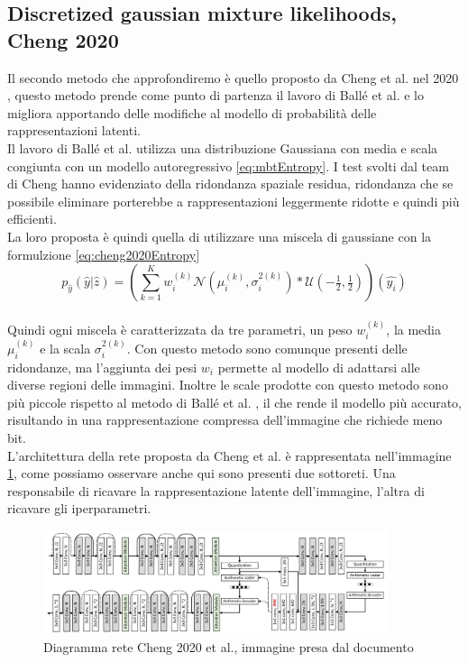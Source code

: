 \subsection{Discretized gaussian mixture likelihoods, Cheng 2020}
Il secondo metodo che approfondiremo è quello proposto da Cheng et al. nel 2020 \cite{cheng2020learned}, questo metodo prende come punto di partenza il lavoro di Ballé et al. \cite{minnen2018joint} e lo migliora apportando delle modifiche al modello di probabilità delle rappresentazioni latenti.\\
Il lavoro di Ballé et al. \cite{minnen2018joint} utilizza una distribuzione Gaussiana con media e scala congiunta con un modello autoregressivo \ref{eq:mbtEntropy}. I test svolti dal team di Cheng hanno evidenziato della ridondanza spaziale residua, ridondanza che se possibile eliminare porterebbe a rappresentazioni leggermente ridotte e quindi più efficienti.\\
La loro proposta è quindi quella di utilizzare una miscela di gaussiane con la formulzione \ref{eq:cheng2020Entropy}
\begin{equation}\label{eq:cheng2020Entropy}
    p_{\hat{y}}(\hat{y}|\hat{z}) = (\sum_{k=1}^{K} w_{i}^{(k)} \mathcal{N}(\mu_{i}^{(k)},\sigma_{i}^{2(k)})*\mathcal{U}(-\tfrac{1}{2},\tfrac{1}{2}))(\hat{y_{i}})
\end{equation}\\
Quindi ogni miscela è caratterizzata da tre parametri, un peso $w_{i}^{(k)}$, la media $\mu_{i}^{(k)}$ e la scala $\sigma_{i}^{2(k)}$.
Con questo metodo sono comunque presenti delle ridondanze, ma l’aggiunta dei pesi $w_{i}$ permette al modello di adattarsi alle diverse regioni delle immagini. Inoltre le scale prodotte con questo metodo sono più piccole rispetto al metodo di Ballé et al. \cite{minnen2018joint}, il che rende il modello più accurato, risultando in una rappresentazione compressa dell’immagine che richiede meno bit.\\
L’architettura della rete proposta da Cheng et al. \cite{cheng2020learned} è rappresentata nell’immagine \ref{fig:cheng2020Network}, come possiamo osservare anche qui sono presenti due sottoreti. Una responsabile di ricavare la rappresentazione latente dell’immagine, l’altra di ricavare gli iperparametri.\\
\begin{figure}[!h]
    \centering
    \includegraphics[width=0.9\textwidth]{Immagini/Cheng2020_Rete.png}
    \caption{Diagramma rete Cheng 2020 et al., immagine presa dal documento \cite{cheng2020learned}}
    \label{fig:cheng2020Network}
\end{figure}\\
